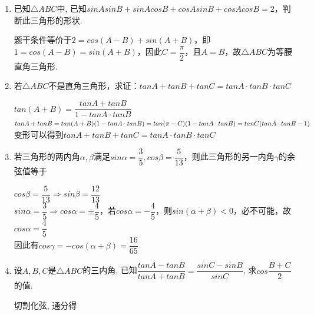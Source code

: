 \begin{enumerate}
\begin{enumerate}
        \begin{jieda}
            $2cosBcosC = 1-cosA$，即$2cosBcosC = 1+cos(B+C)$，即$cosBcosC+sinBsinC = 1$，因此有$B=C$. \\
            $2sinBcosC = 1+sin(B-C)$，即$sinBcosC+cosBsinC = 1$，因此有$sin(B+C) = 1$，即$B+C = \dfrac{\pi}{2}$，故$A = \dfrac{\pi}{2}$，因此$\triangle ABC$是等腰直角三角形.
        \end{jieda}
        \item 已知$\triangle{ABC}$中, 已知$sin{A}sin{B}+sin{A}cos{B}+cos{A}sin{B}+cos{A}cos{B}=2$，判断此三角形的形状.
        \begin{jieda}
        题干条件等价于$2=cos(A-B)+sin(A+B)$，即$ 1=cos(A-B)=sin(A+B)$，因此$C = \dfrac{\pi}{2}$，且$ A = B$，故$\triangle ABC$为等腰直角三角形.
        \end{jieda}
        \item 若$\triangle ABC$不是直角三角形，求证：$tanA + tanB + tanC = tanA \cdot tanB \cdot tanC$
        \begin{jieda}
            $tan(A+B) = \dfrac{tanA + tanB}{1 - tanA \cdot tanB}$ \\
            $tanA + tanB = tan(A+B) (1 - tanA \cdot tanB) = tan(\pi-C) (1 - tanA \cdot tanB)\\ = tanC (tanA \cdot tanB - 1)$ \\
            变形可以得到$tanA + tanB + tanC = tanA \cdot tanB \cdot tanC$
        \end{jieda}
        \item 若三角形的两内角$\alpha, \beta$满足$sin\alpha = \dfrac{3}{5}, cos\beta = \dfrac{5}{13}$，则此三角形的另一内角$\gamma$的余弦值等于
        \begin{jieda}
            $cos\beta = \dfrac{5}{13} \Longrightarrow sin\beta = \dfrac{12}{13}$ \\
            $sin\alpha = \dfrac{3}{5} \Longrightarrow cos\alpha = \pm \dfrac{4}{5}$，若$cos\alpha = -\dfrac{4}{5}$，则$sin(\alpha+\beta) < 0$，必不可能，故$cos\alpha = \dfrac{4}{5}$ \\
            因此有$cos\gamma = -cos(\alpha + \beta) = \dfrac{16}{65}$
        \end{jieda}
        \item 设$A,B,C$是$\triangle{ABC}$的三内角, 已知$\dfrac{tan{A}-tan{B}}{tan{A}+tan{B}}=\dfrac{sin{C}-sin{B}}{sin{C}}$, 求$cos\dfrac{B+C}{2}$的值. 
        \begin{jieda}
        切割化弦, 通分得
        \begin{align*}

\end{align*}
\end{jieda}
\end{enumerate}
\end{enumerate}
